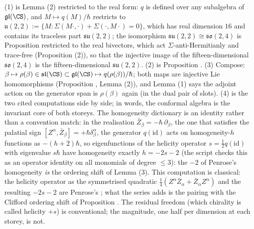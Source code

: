 (1) is Lemma (2) restricted to the real form: $q$ is defined over any subalgebra of $\mathfrak{gl}(\CS)$, and $M \mapsto q(M)/\hbar$ restricts to $\mathfrak{u}(2,2) := \{M : \Sigma(M\cdot,\cdot) + \Sigma(\cdot,M\cdot) = 0\}$, which has real dimension $16$ and contains its traceless part $\mathfrak{su}(2,2)$; the isomorphism $\mathfrak{su}(2,2)\cong\mathfrak{so}(2,4)$ is Proposition  restricted to the real bivectors, which act $\Sigma$-anti-Hermitianly and trace-free (Proposition (2)), so that the injective image of the fifteen-dimensional $\mathfrak{so}(2,4)$ is the fifteen-dimensional $\mathfrak{su}(2,2)$. (2) is Proposition . (3) Compose: $\beta \mapsto \rho(\beta) \in \mathfrak{sl}(\CS) \subset \mathfrak{gl}(\CS) \mapsto q(\rho(\beta))/\hbar$; both maps are injective Lie homomorphisms (Proposition , Lemma (2)), and Lemma (1) says the adjoint action on the generator span is $\rho(\beta)$ again (in the dual pair of slots). (4) is the two cited computations side by side; in words, the conformal algebra is the invariant core of both storeys. The homogeneity dictionary is an identity rather than a convention match: in the realisation $\bar Z_\beta = -\hbar\,\partial_\beta$, the one that satisfies the palatial sign $[Z^\alpha, \bar Z_\beta] = +\hbar\delta^\alpha_\beta$, the generator $q(\mathrm{id})$ acts on homogeneity-$h$ functions as $-(h+2)\hbar$, so eigenfunctions of the helicity operator $s = \tfrac12 q(\mathrm{id})$ with eigenvalue $s\hbar$ have homogeneity exactly $h = -2s - 2$ (the script checks this as an operator identity on all monomials of degree $\le 3$): the $-2$ of Penrose's homogeneity \cite{Penrose1967, PenroseRindler86} \emph{is} the ordering shift of Lemma (3). This computation is classical: the helicity operator as the symmetrised quadratic $\tfrac14(Z^\alpha\bar Z_\alpha + \bar Z_\alpha Z^\alpha)$ and the resulting $-2s-2$ are Penrose's \cite[Vol.~2, Ch.~6]{PenroseRindler86}; what the series adds is the pairing with the Clifford ordering shift of Proposition . The residual freedom (which chirality is called helicity $+s$) is conventional; the magnitude, one half per dimension at each storey, is not.
